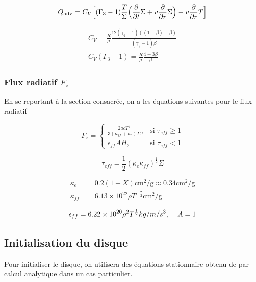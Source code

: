 \documentclass[a4paper,12pt]{article}
\newcommand{\derivt}[1]{\frac{\partial}{\partial t} #1}
\newcommand{\derivr}[1]{\frac{\partial}{\partial r} #1}
\begin{document}
\begin{equation}
    Q_{\rm{adv}} = C_V\Big[ (\Gamma_3 - 1) \frac{T}{\Sigma}\Big( \derivt{\Sigma}+v\derivr{\Sigma} \Big) -v\derivr{T} \Big]
\end{equation}


\begin{gather}
    C_V = \frac{R}{\mu}\frac{12(\gamma_g -1)((1-\beta)+\beta)}{(\gamma_g - 1)\beta}\\
    C_V(\Gamma_3 -1) = \frac{R}{\mu}\frac{4-3\beta}{\beta}
\end{gather}



\subsubsection{Flux radiatif $F_z$}
En se reportant à la section consacrée, on a les équations suivantes pour le flux radiatif

\begin{equation}
    F_z=\begin{cases} \frac{2acT^4}{3(\kappa_{ff}+\kappa_e)\Sigma}, & \mbox{si } \tau_{eff} \geq 1\\ \epsilon_{ff}AH, & \mbox{si } \tau_{eff} < 1  \end{cases}
\end{equation}

\begin{equation}
    \tau_{eff}=\frac{1}{2}(\kappa_e \kappa_{ff})^{\frac{1}{2}}\Sigma
\end{equation}

\begin{equation}
    \begin{split}
        \kappa_e &= 0.2(1+X) \text{cm$^2$/g} \approx 0.34 \text{cm$^2$/g}\\
        \kappa_{ff} &= 6.13 \times 10^{22}\rho T^{-\frac{7}{2}} \text{cm$^2$/g}
    \end{split}
\end{equation}

\begin{equation}
    \epsilon_{ff} = 6.22 \times 10^{20} \rho^{2} T^{\frac{1}{2}} \text{$kg/m/s^3$, \quad} A=1
\end{equation}


\subsection{Initialisation du disque}

Pour initialiser le disque, on utilisera des équations stationnaire obtenu de par calcul analytique dans un cas particulier.
\end{document}
